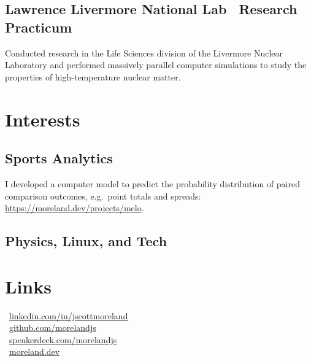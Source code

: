 \documentclass[letterpaper,10pt]{article}
\begin{document}
\begin{multicols}{2}
\subsection{Lawrence Livermore National Lab \textbar\ Research Practicum}

Conducted research in the Life Sciences division of the Livermore Nuclear
Laboratory and performed massively parallel computer simulations to study the
properties of high-temperature nuclear matter.

\section{Interests}

\subsection{Sports Analytics}
\smallskip

I developed a computer model to predict the probability distribution of paired
comparison outcomes, e.g.\ point totals and spreads:
\href{https://moreland.dev/projects/melo}{https://moreland.dev/projects/melo}.
\smallskip

\subsection{Physics, Linux, and Tech}

\vfill

\section{Links}

 \textbar\ \href{https://www.linkedin.com/in/jscottmoreland}{linkedin.com/in/jscottmoreland}\\[1ex]
 \textbar\ \href{https://github.com/morelandjs}{github.com/morelandjs}\\[1ex]
 \textbar\ \href{https://www.linkedin.com/in/jscottmoreland/}{speakerdeck.com/morelandjs}\\[1ex]
 \textbar\ \href{https://moreland.dev}{moreland.dev}\\

\end{multicols}
\end{document}

